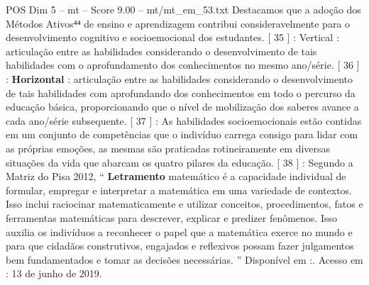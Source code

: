 \begin{textsample}{POS Dim 5 – mt – Score 9.00 – mt/mt\_em\_53.txt}
Destacamos que a adoção dos Métodos Ativos⁴⁴ de ensino e aprendizagem contribui consideravelmente para o desenvolvimento cognitivo e socioemocional dos estudantes. [ 35 ] : Vertical : articulação entre as habilidades considerando o desenvolvimento de tais habilidades com o aprofundamento dos conhecimentos no mesmo ano/série. [ 36 ] : \textbf{Horizontal} : articulação entre as habilidades considerando o desenvolvimento de tais habilidades com aprofundando dos conhecimentos em todo o percurso da educação básica, proporcionando que o nível de mobilização dos saberes avance a cada ano/série subsequente. [ 37 ] : As habilidades socioemocionais estão contidas em um conjunto de competências que o indivíduo carrega consigo para lidar com as próprias emoções, as mesmas são praticadas rotineiramente em diversas situações da vida que abarcam os quatro pilares da educação. [ 38 ] : Segundo a Matriz do Pisa 2012, “ \textbf{Letramento} matemático é a capacidade individual de formular, empregar e interpretar a matemática em uma variedade de contextos.
Isso inclui raciocinar matematicamente e utilizar conceitos, procedimentos, fatos e ferramentas matemáticas para descrever, explicar e predizer fenômenos.
Isso auxilia os indivíduos a reconhecer o papel que a matemática exerce no mundo e para que cidadãos construtivos, engajados e reflexivos possam fazer julgamentos bem fundamentados e tomar as decisões necessárias. ” Disponível em :.
Acesso em : 13 de junho de 2019.

\end{textsample}
